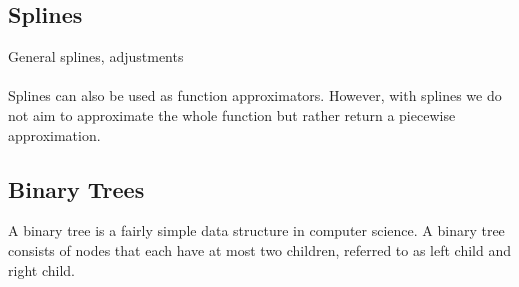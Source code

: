 
\subsection{Splines}
General splines, adjustments \\ \\
Splines can also be used as function approximators. However, with splines we do not aim to approximate the whole function but rather return a piecewise approximation.



\subsection{Binary Trees}
A binary tree is a fairly simple data structure in computer science. A binary tree consists of nodes that each have at most two children, referred to as left child and right child.
